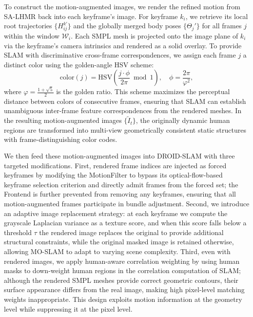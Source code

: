 \documentclass[runningheads]{llncs}
\begin{document}
To construct the motion-augmented images, we render the refined motion from SA-LHMR back into each keyframe's image. For keyframe $k_i$, we retrieve its local root trajectories $\{H_{ij}^{k'}\}$ and the globally merged body poses $\{\Theta_j'\}$ for all frames $j$ within the window $\mathcal{W}_i$. Each SMPL mesh is projected onto the image plane of $k_i$ via the keyframe's camera intrinsics and rendered as a solid overlay. To provide SLAM with discriminative cross-frame correspondences, we assign each frame $j$ a distinct color using the golden-angle HSV scheme:
%
\begin{equation}
  \text{color}(j) = \text{HSV}\!\left(\frac{j \cdot \phi}{2\pi} \bmod 1\right), \quad \phi = \frac{2\pi}{\varphi^2},
\end{equation}
%
where $\varphi = \frac{1+\sqrt{5}}{2}$ is the golden ratio. This scheme maximizes the perceptual distance between colors of consecutive frames, ensuring that SLAM can establish unambiguous inter-frame feature correspondences from the rendered meshes. In the resulting motion-augmented images $\{\tilde{I}_t\}$, the originally dynamic human regions are transformed into multi-view geometrically consistent static structures with frame-distinguishing color codes.

We then feed these motion-augmented images into DROID-SLAM \cite{DROIDSLAM2021} with three targeted modifications. First, rendered frame indices are injected as forced keyframes by modifying the MotionFilter to bypass its optical-flow-based~\cite{RAFT2020} keyframe selection criterion and directly admit frames from the forced set; the Frontend is further prevented from removing any keyframes, ensuring that all motion-augmented frames participate in bundle adjustment. Second, we introduce an adaptive image replacement strategy: at each keyframe we compute the grayscale Laplacian variance as a texture score, and when this score falls below a threshold $\tau$ the rendered image replaces the original to provide additional structural constraints, while the original masked image is retained otherwise, allowing MO-SLAM to adapt to varying scene complexity. Third, even with rendered images, we apply human-aware correlation weighting by using human masks to down-weight human regions in the correlation computation of SLAM; although the rendered SMPL meshes provide correct geometric contours, their surface appearance differs from the real image, making high pixel-level matching weights inappropriate. This design exploits motion information at the geometry level while suppressing it at the pixel level.
\end{document}
